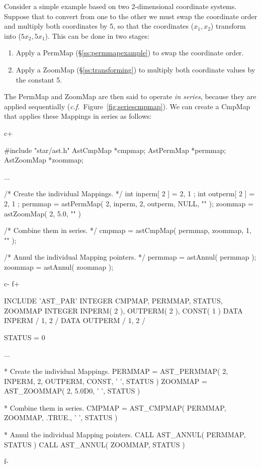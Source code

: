 \documentclass[twoside,11pt]{starlink}
\providecommand{\secref}[1]{\S\ref{#1}}
\begin{document}
Consider a simple example based on two 2-dimensional coordinate
systems. Suppose that to convert from one to the other we must swap
the coordinate order and multiply both coordinates by 5, so that the
coordinates ($x_1,x_2$) transform into ($5x_2,5x_1$). This can be done
in two stages:

\begin{enumerate}
\item Apply a PermMap (\secref{ss:permmapexample}) to swap the
coordinate order.

\item Apply a ZoomMap (\secref{ss:transforming}) to multiply both
coordinate values by the constant 5.
\end{enumerate}

The PermMap and ZoomMap are then said to operate \emph{in series},
because they are applied sequentially
(\emph{c.f.}\ Figure~\ref{fig:seriescmpmap}).  We can create a CmpMap
that applies these Mappings in series as follows:

c+
\small
\begin{terminalv}
#include "star/ast.h"
AstCmpMap *cmpmap;
AstPermMap *permmap;
AstZoomMap *zoommap;

...

/* Create the individual Mappings. */
{
   int inperm[ 2 ] = { 2, 1 };
   int outperm[ 2 ] = { 2, 1 };
   permmap = astPermMap( 2, inperm, 2, outperm, NULL, "" );
}
zoommap = astZoomMap( 2, 5.0, "" )

/* Combine them in series. */
cmpmap = astCmpMap( permmap, zoommap, 1, "" );

/* Annul the individual Mapping pointers. */
permmap = astAnnul( permmap );
zoommap = astAnnul( zoommap );
\end{terminalv}
\normalsize
c-
f+
\small
\begin{terminalv}
      INCLUDE 'AST_PAR'
      INTEGER CMPMAP, PERMMAP, STATUS, ZOOMMAP
      INTEGER INPERM( 2 ), OUTPERM( 2 ), CONST( 1 )
      DATA INPERM / 1, 2 /
      DATA OUTPERM / 1, 2 /

      STATUS = 0

      ...

*  Create the individual Mappings.
      PERMMAP = AST_PERMMAP( 2, INPERM, 2, OUTPERM, CONST, ' ', STATUS )
      ZOOMMAP = AST_ZOOMMAP( 2, 5.0D0, ' ', STATUS )

*  Combine them in series.
      CMPMAP = AST_CMPMAP( PERMMAP, ZOOMMAP, .TRUE., ' ', STATUS )

*  Annul the individual Mapping pointers.
      CALL AST_ANNUL( PERMMAP, STATUS )
      CALL AST_ANNUL( ZOOMMAP, STATUS )
\end{terminalv}
\normalsize
f-
\end{document}
